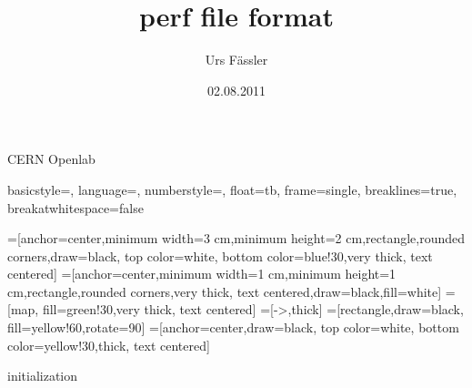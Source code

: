 
\usepackage[utf8]{inputenc}
\usepackage{amsmath}
\usepackage{amsfonts}
\usepackage{amssymb}
\usepackage{multicol}
\usepackage{graphicx}
\usepackage{tikz}
\usetikzlibrary{arrows,positioning,shapes}
\usepackage{listings}
\usepackage{multicol}
\usepackage{appendixnumberbeamer}
\usepackage{pstricks}
\usepackage{marvosym}
\usepackage{biblatex}

\newcommand{\code}[1]{\texttt{#1}}

\title{perf file format}
\author{Urs F\"assler}
\date{02.08.2011}
\institute
{
  CERN Openlab
}

\lstset
{  
  basicstyle=\small\ttfamily,
  language=,
  numberstyle={\color{Grey}},
  float=tb,
  frame=single,
  breaklines=true, %
  breakatwhitespace=false %
}

%


\beamertemplatenavigationsymbolsempty


\begin{frame}[plain]
  \titlepage
\end{frame}

\setcounter{framenumber}{0}

=[anchor=center,minimum width=3 cm,minimum height=2 cm,rectangle,rounded corners,draw=black, top color=white, bottom color=blue!30,very thick, text centered]
=[anchor=center,minimum width=1 cm,minimum height=1 cm,rectangle,rounded corners,very thick, text centered,draw=black,fill=white]
=[map, fill=green!30,very thick, text centered]
=[->,thick]
=[rectangle,draw=black, fill=yellow!60,rotate=90]
=[anchor=center,draw=black, top color=white, bottom color=yellow!30,thick, text centered]

\begin{frame}{initialization}
\begin{center}
\end{center}
\end{frame}


